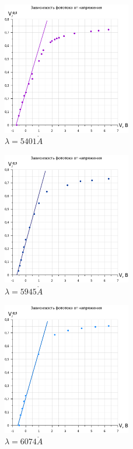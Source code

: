 \documentclass[a4paper, 12pt]{article}
\begin{document}
\begin{figure}[h]
\begin{center}
\includegraphics[width = 0.5\textwidth]{5401.png}
\caption{$\lambda = 5401 \mathring{A}$}
\label{fig:purp}
\end{center}
\end{figure}

\begin{figure}[h]
\begin{center}
\includegraphics[width = 0.5\textwidth]{5945.png}
\caption{$\lambda = 5945 \mathring{A}$}
\label{fig:blue}
\end{center}
\end{figure}

\begin{figure}[h]
\begin{center}
\includegraphics[width = 0.5\textwidth]{6074.png}
\caption{$\lambda = 6074 \mathring{A}$}
\label{fig:cyan}
\end{center}
\end{figure}
\end{document}
